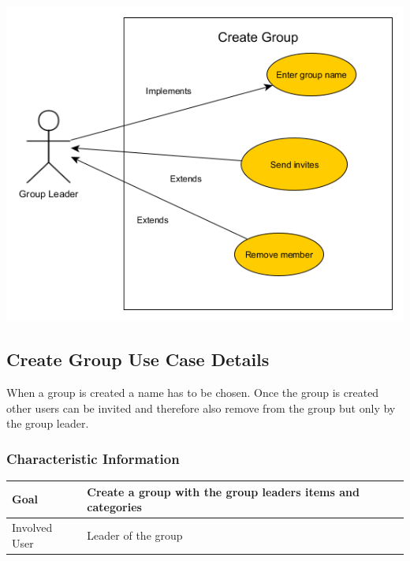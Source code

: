 \documentclass[12pt]{article}
\theoremstyle{definition}
\begin{document}
\includegraphics[scale=.5]{UseCaseCreateGroup.png}\\

\subsection{Create Group Use Case Details}

When a group is created a name has to be chosen. Once the group is created other users can be invited and therefore also remove from the group but only by the group leader.

\subsubsection{Characteristic Information}

\begin{tabular}{|l|l|}
\hline
Goal &  Create a group with the group leaders items and categories\\ \hline
Involved User & Leader of the group \\ \hline
\end{tabular}
\end{document}
